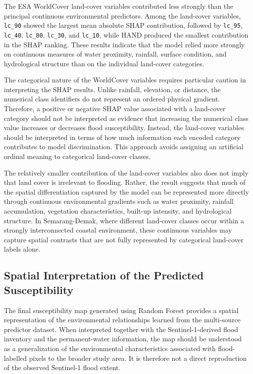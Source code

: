 \documentclass[11pt,twoside]{article}
\begin{document}
The ESA WorldCover land-cover variables contributed less strongly than the principal continuous environmental predictors. Among the land-cover variables, \texttt{lc\_90} showed the largest mean absolute SHAP contribution, followed by \texttt{lc\_95}, \texttt{lc\_40}, \texttt{lc\_80}, \texttt{lc\_30}, and \texttt{lc\_10}, while HAND produced the smallest contribution in the SHAP ranking. These results indicate that the model relied more strongly on continuous measures of water proximity, rainfall, surface condition, and hydrological structure than on the individual land-cover categories.

The categorical nature of the WorldCover variables requires particular caution in interpreting the SHAP results. Unlike rainfall, elevation, or distance, the numerical class identifiers do not represent an ordered physical gradient. Therefore, a positive or negative SHAP value associated with a land-cover category should not be interpreted as evidence that increasing the numerical class value increases or decreases flood susceptibility. Instead, the land-cover variables should be interpreted in terms of how much information each encoded category contributes to model discrimination. This approach avoids assigning an artificial ordinal meaning to categorical land-cover classes.

The relatively smaller contribution of the land-cover variables also does not imply that land cover is irrelevant to flooding. Rather, the result suggests that much of the spatial differentiation captured by the model can be represented more directly through continuous environmental gradients such as water proximity, rainfall accumulation, vegetation characteristics, built-up intensity, and hydrological structure. In Semarang-Demak, where different land-cover classes occur within a strongly interconnected coastal environment, these continuous variables may capture spatial contrasts that are not fully represented by categorical land-cover labels alone.

\subsection{Spatial Interpretation of the Predicted Susceptibility}\label{spatial-interpretation}

The final susceptibility map generated using Random Forest provides a spatial representation of the environmental relationships learned from the multi-source predictor dataset. When interpreted together with the Sentinel-1-derived flood inventory and the permanent-water information, the map should be understood as a generalization of the environmental characteristics associated with flood-labelled pixels to the broader study area. It is therefore not a direct reproduction of the observed Sentinel-1 flood extent.
\end{document}
